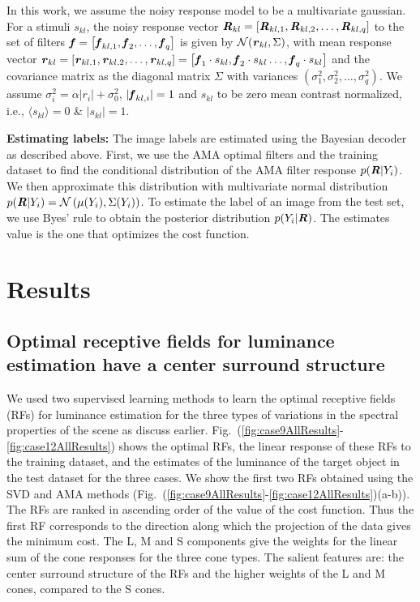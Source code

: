 \documentclass{jov}
\begin{document}
In this work, we assume the noisy response model to be a multivariate gaussian. For a stimuli $s_{kl}$, the noisy response vector ${\textbf{\textit R}}_{kl} = \left[{\textbf{\textit R}}_{kl,1},{\textbf{\textit R}}_{kl,2},\dots,{\textbf{\textit R}}_{kl,q}\right]$ to the set of filters ${\textbf{\textit f}} = \left[{\textbf{\textit f}}_{kl,1},{\textbf{\textit f}}_{2},\dots,{\textbf{\textit f}}_{q}\right]$ is given by $\mathcal{N}({\textbf{\textit r}}_{kl}, \Sigma)$, with mean response vector ${\textbf{\textit r}}_{kl} = \left[{\textbf{\textit r}}_{kl,1},{\textbf{\textit r}}_{kl,2},\dots,{\textbf{\textit r}}_{kl,q}\right] = \left[{\textbf{\textit f}}_{1}\cdot s_{kl},{\textbf{\textit f}}_{2}\cdot s_{kl}\dots,{\textbf{\textit f}}_{q}\cdot s_{kl}\right]$ and the covariance matrix as the diagonal matrix $\Sigma$ with variances $\left(\sigma_1^2, \sigma_2^2,\dots, \sigma_q^2 \right)$. We assume $\sigma_i^2 = \alpha |r_i| + \sigma_0^2$, $|{\textbf{\textit f}}_{kl,i}|=1$ and $s_{kl}$ to be zero mean contrast normalized, i.e., $\langle{s_{kl}}\rangle = 0$ \& ${|s_{kl}|=1}$.

{\bf Estimating labels:} The image labels are estimated using the Bayesian decoder as described above. First, we use the AMA optimal filters and the training dataset to find the conditional distribution of the AMA filter response $p({\textbf {\textit R} }|Y_i)$. We then approximate this distribution with multivariate normal distribution $p({\textbf {\textit R} }|Y_i) = \mathcal{N}\left(\mu(Y_i),\Sigma(Y_i) \right)$. To estimate the label of an image from the test set, we use Byes' rule to obtain the posterior distribution $p(Y_i|{\textbf {\textit R} })$. The estimates value is the one that optimizes the cost function.

\section{Results} \label{Results}
\subsection{Optimal receptive fields for luminance estimation have a center surround structure}
We used two supervised learning methods to learn the optimal receptive fields (RFs) for luminance estimation for the three types of variations in the spectral properties of the scene as discuss earlier. Fig.~(\ref{fig:case9AllResults}-\ref{fig:case12AllResults}) shows the optimal RFs, the linear response of these RFs to the training dataset, and the estimates of the luminance of the target object in the test dataset for the three cases. We show the first two RFs obtained using the SVD and AMA methods (Fig.~(\ref{fig:case9AllResults}-\ref{fig:case12AllResults})(a-b)). The RFs are ranked in ascending order of the value of the cost function. Thus the first RF corresponds to the direction along which the projection of the data gives the minimum cost. The L, M and S components give the weights for the linear sum of the cone responses for the three cone types. The salient features are: the center surround structure of the RFs and the higher weights of the L and M cones, compared to the S cones. 
\end{document}
